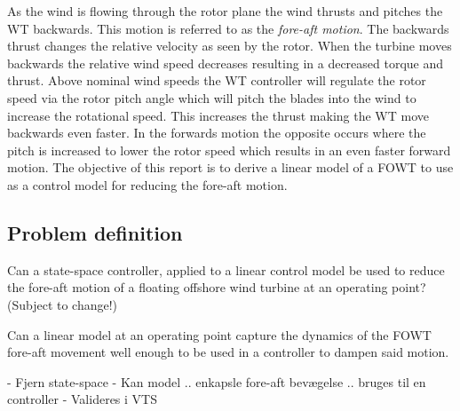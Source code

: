 \smallskip
As the wind is flowing through the rotor plane the wind thrusts and pitches the WT backwards. This motion is referred to as the \textit{fore-aft motion}. The backwards thrust changes the relative velocity as seen by the rotor. When the turbine moves backwards the relative wind speed decreases resulting in a decreased torque and thrust. Above nominal wind speeds the WT controller will regulate the rotor speed via the rotor pitch angle which will pitch the blades into the wind to increase the rotational speed. This increases the thrust making the WT move backwards even faster. In the forwards motion the opposite occurs where the pitch is increased to lower the rotor speed which results in an even faster forward motion. The objective of this report is to derive a linear model of a FOWT to use as a control model for reducing the fore-aft motion. 


\subsection{Problem definition} \label{sec:intro_problemdef}
Can a state-space controller, applied to a linear control model be used to reduce the fore-aft motion of a floating offshore wind turbine at an operating point? (Subject to change!)

Can a linear model at an operating point capture the dynamics of the FOWT fore-aft movement well enough to be used in a controller to dampen said motion.

- Fjern state-space
- Kan model .. enkapsle fore-aft bevægelse .. bruges til en controller
- Valideres i VTS

